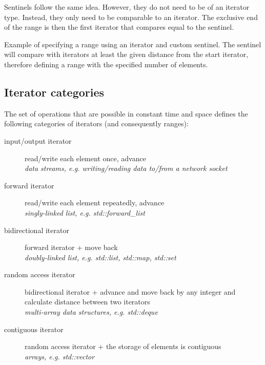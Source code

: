 Sentinels follow the same idea. However, they do not need to be of an iterator type. Instead, they only need to be comparable to an iterator. The exclusive end of the range is then the first iterator that compares equal to the sentinel.

\begin{box-note}
\footnotesize Example of specifying a range using an iterator and custom sentinel. The sentinel will compare  with iterators at least the given distance from the start iterator, therefore defining a range with the specified number of elements.
\tcblower
{}
\end{box-note}

\subsection{Iterator categories}

The set of operations that are possible in constant time and space defines the following categories of iterators (and consequently ranges):

\begin{description}
    \item[input/output iterator] read/write each element once, advance\\
    \textit{data streams, e.g. writing/reading data to/from a network socket}
    \item[forward iterator] read/write each element repeatedly, advance\\
    \textit{singly-linked list, e.g. std::forward\_list}
    \item[bidirectional iterator] forward iterator + move back\\
    \textit{doubly-linked list, e.g. std::list, std::map, std::set}
    \item[random access iterator] bidirectional iterator + advance and move back by any integer and calculate distance between two iterators\\
    \textit{multi-array data structures, e.g. std::deque}
    \item[contiguous iterator] random access iterator + the storage of elements is contiguous\\
    \textit{arrays, e.g. std::vector}
\end{description}

